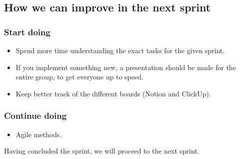 \subsection{How we can improve in the next sprint}
\subsubsection{Start doing}
\begin{itemize}
    \item Spend more time understanding the exact tasks for the given sprint.
    \item If you implement something new, a presentation should be made for the entire group, to get everyone up to speed.
    \item Keep better track of the different boards (Notion and ClickUp).
\end{itemize}
\subsubsection{Continue doing}
\begin{itemize}
    \item Agile methods.
\end{itemize}

Having concluded the sprint, we will proceed to the next sprint.
